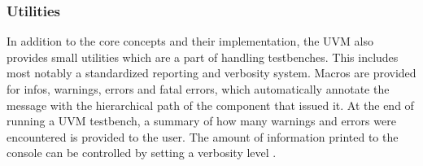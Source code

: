 \subsubsection{Utilities} %

In addition to the core concepts and their implementation, the UVM also provides small utilities which are a part of
handling testbenches. This includes most notably a standardized reporting and verbosity system. Macros are provided
for infos, warnings, errors and fatal errors, which automatically annotate the message with the hierarchical path of
the component that issued it. At the end of running a UVM testbench, a summary of how many warnings and errors were
encountered is
provided to the user. The amount of information printed to the console can be controlled by setting a verbosity level
\cite[Ch. 19]{salemi2013uvm}.

